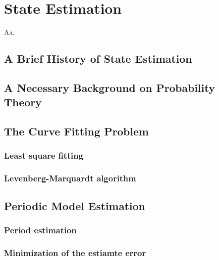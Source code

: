 
\chapter{\color{red}State Estimation}
\label{cp:est}


\lettrine{A}{a}, 


\section{\color{red}A Brief History of State Estimation}


\section{\color{red}A Necessary Background on Probability Theory}


\section{\color{red}The Curve Fitting Problem}

\subsection{\color{red}Least square fitting}

\subsection{\color{red}Levenberg-Marquardt algorithm}


\section{\color{red}Periodic Model Estimation}

\subsection{\color{red}Period estimation}

\subsection{\color{red}Minimization of the estiamte error}

